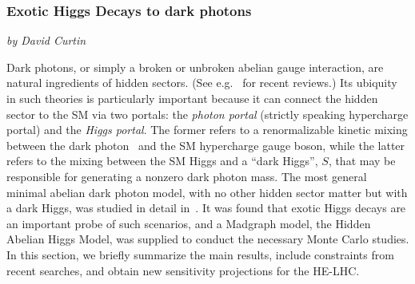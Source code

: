 \subsubsection{Exotic Higgs Decays to dark photons}

\begin{center}
    {\it{ by David Curtin}}
\end{center} 







Dark photons, or simply a broken or unbroken abelian gauge interaction, are natural ingredients of hidden sectors. (See e.g.~\cite{Jaeckel:2010ni,Hewett:2012ns,Essig:2013lka,Alexander:2016aln,Battaglieri:2017aum} for recent reviews.) Its ubiquity in such theories is particularly important because it can connect the hidden sector to the SM via two portals: the \emph{photon portal} (strictly speaking hypercharge portal) and the \emph{Higgs portal}. The former refers to a renormalizable kinetic mixing between the dark photon~\cite{Holdom:1985ag,Galison:1983pa,Dienes:1996zr} and the SM hypercharge gauge boson, while the latter refers to the mixing between the SM Higgs and a ``dark Higgs'', $S$, that may be responsible for generating a nonzero dark photon mass. 
%
The most general minimal abelian dark photon model, with no other hidden sector matter but with a dark Higgs, was studied in detail in~\cite{Curtin:2014cca}. It was found that exotic Higgs decays are an important probe of such scenarios, and a Madgraph \cite{Alwall:2011uj} model, the Hidden Abelian Higgs Model, was supplied to conduct the necessary Monte Carlo studies. In this section, we briefly summarize the main results, include constraints from recent searches, and obtain new sensitivity projections for the HE-LHC. 


